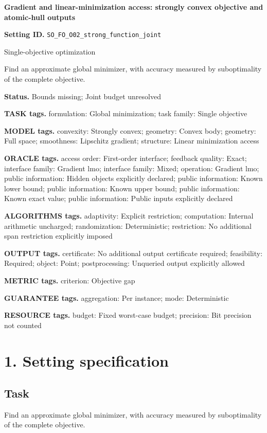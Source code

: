 \documentclass[10pt,a4paper]{article}
\begin{document}
\raggedright

{\LARGE\bfseries\sffamily\color{AtlasNavy} Gradient and linear-minimization access: strongly convex objective and atomic-hull outputs\par}\vspace{5pt}
\textbf{Setting ID.} \texttt{SO\_\allowbreak{}FO\_\allowbreak{}O02\_\allowbreak{}strong\_\allowbreak{}function\_\allowbreak{}joint}

Single-objective optimization

Find an approximate global minimizer, with accuracy measured by suboptimality of the complete objective.

\textbf{Status.} Bounds missing; Joint budget unresolved

\textbf{TASK tags.} formulation: Global minimization; task family: Single objective

\textbf{MODEL tags.} convexity: Strongly convex; geometry: Convex body; geometry: Full space; smoothness: Lipschitz gradient; structure: Linear minimization access

\textbf{ORACLE tags.} access order: First-order interface; feedback quality: Exact; interface family: Gradient lmo; interface family: Mixed; operation: Gradient lmo; public information: Hidden objects explicitly declared; public information: Known lower bound; public information: Known upper bound; public information: Known exact value; public information: Public inputs explicitly declared

\textbf{ALGORITHMS tags.} adaptivity: Explicit restriction; computation: Internal arithmetic uncharged; randomization: Deterministic; restriction: No additional span restriction explicitly imposed

\textbf{OUTPUT tags.} certificate: No additional output certificate required; feasibility: Required; object: Point; postprocessing: Unqueried output explicitly allowed

\textbf{METRIC tags.} criterion: Objective gap

\textbf{GUARANTEE tags.} aggregation: Per instance; mode: Deterministic

\textbf{RESOURCE tags.} budget: Fixed worst-case budget; precision: Bit precision not counted

\section{1. Setting specification}
\subsection{Task}
Find an approximate global minimizer, with accuracy measured by suboptimality of the complete objective.
\end{document}
